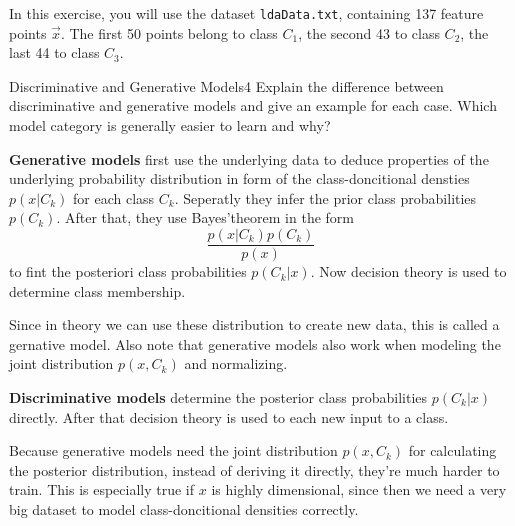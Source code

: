 \newif\ifvimbug
\vimbugfalse

\ifvimbug

\fi


In this exercise, you will use the dataset \texttt{ldaData.txt}, containing 137 feature points $\vec x$. The first 50 points belong to class $C_1$, the second 43 to class $C_2$, the last 44 to class $C_3$.


\begin{questions}

\begin{question}{Discriminative and Generative Models}{4}
Explain the difference between discriminative and generative models and give an example for each case.
Which model category is generally easier to learn and why?
 
\begin{answer}
\textbf{Generative models} first use the underlying data to deduce properties of the underlying probability distribution in form of the class-doncitional densties $p(x|C_k)$ for each class $C_k$. Seperatly they infer the prior class probabilities $p(C_k)$. After that, they use Bayes'theorem  in the form 
\begin{equation}
	\frac{p(x|C_k) p(C_k)}{p(x)}
\end{equation}
to fint the posteriori class probabilities $p(C_k|x)$. Now decision theory is used to determine class membership. 

Since in theory we can use these distribution to create new data, this is called a gernative model. Also note that generative models also work when modeling the joint distribution $p(x, C_k)$ and normalizing. 


\textbf{Discriminative models} determine the posterior class probabilities $p(C_k|x)$ directly. After that decision theory is used to each new input to a class. 


Because generative models need the joint distribution $p(x,C_k)$ for calculating the posterior distribution, instead of deriving it directly, they're much harder to train. This is especially true if $x$ is highly dimensional, since then we need a very big dataset to model class-doncitional densities correctly.

 

\end{answer}

\end{question}


\end{questions}
